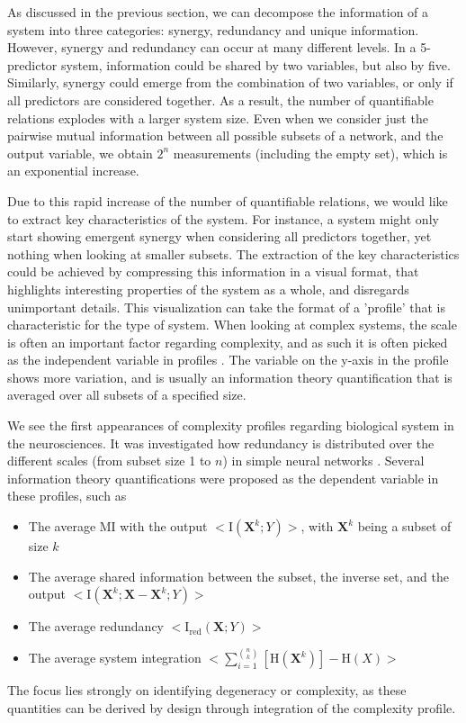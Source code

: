 \documentclass[../main.tex]{subfiles}
\begin{document}
As discussed in the previous section, we can decompose the information of a system into three categories: synergy, redundancy and unique information.
However, synergy and redundancy can occur at many different levels.
In a 5-predictor system, information could be shared by two variables, but also by five.
Similarly, synergy could emerge from the combination of two variables, or only if all predictors are considered together.
As a result, the number of quantifiable relations explodes with a larger system size.
Even when we consider just the pairwise mutual information between all possible subsets of a network, and the output variable, we obtain $2^n$ measurements (including the empty set), which is an exponential increase.

Due to this rapid increase of the number of quantifiable relations, we would like to extract key characteristics of the system.
For instance, a system might only start showing emergent synergy when considering all predictors together, yet nothing when looking at smaller subsets.
The extraction of the key characteristics could be achieved by compressing this information in a visual format, that highlights interesting properties of the system as a whole, and disregards unimportant details.
This visualization can take the format of a 'profile' that is characteristic for the type of system.
When looking at complex systems, the scale is often an important factor regarding complexity, and as such it is often picked as the independent variable in profiles \cite{bar2013computationally, quax2017quantifying, tononi1999measures}.
The variable on the y-axis in the profile shows more variation, and is usually an information theory quantification that is averaged over all subsets of a specified size.

We see the first appearances of complexity profiles regarding biological system in the neurosciences.
It was investigated how redundancy is distributed over the different scales (from subset size 1 to $n$) in simple neural networks \cite{tononi1999measures}.
Several information theory quantifications were proposed as the dependent variable in these profiles, such as
%
\begin{itemize}
\item The average MI with the output $<\mathrm{I}\left( \mathbf{X}^k;Y \right) >$, with $\mathbf{X}^k$ being a subset of size $k$
\item The average shared information between the subset, the inverse set, and the output  $<\mathrm{I}\left( \mathbf{X}^k;\mathbf{X} - \mathbf{X}^k;Y\right) >$
\item The average redundancy $<\mathrm{I}_\mathrm{red}\left( \mathbf{X};Y\right) >$
\item The average system integration $<\sum_{i = 1}^{\binom{n}{k}}[\mathrm{H}(\mathbf{X}^k)] - \mathrm{H}\left( X\right) >$
\end{itemize}
%
The focus lies strongly on identifying degeneracy or complexity, as these quantities can be derived by design through integration of the complexity profile.
\end{document}
